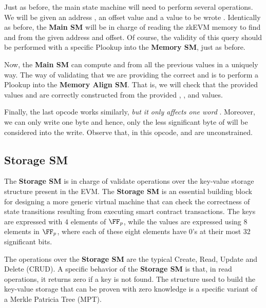 Just as before, the main state machine will need to perform several operations. We will be given an address \addr, an offset value \offset and a value to be wrote \val. Identically as before, the \textbf{Main SM} will be in charge of reading the zkEVM memory to find \mF and \mS from the given address and offset. Of course, the validity of this query should be performed with a specific Plookup into the \textbf{Memory SM}, just as before. 

Now, the \textbf{Main SM} can compute \wF and \wS from all the previous values in a uniquely way. The way of validating that we are providing the correct \wF and \wS is to perform a Plookup into the \textbf{Memory Align SM}. That is, we will check that the provided values \wF and \wS are correctly constructed from the provided \val, \mF, \mS and \offset values. 


Finally, the last opcode \MSTOREE works similarly, \textit{but it only affects one word} \mF. Moreover, we can only write one byte and hence, only the less significant byte of \val will be considered into the write. Observe that, in this opcode, \mS and \wS are unconstrained.




\subsection{Storage SM}


The \textbf{Storage SM} is  in charge of validate operations over the key-value storage structure present in the EVM. The \textbf{Storage SM} is an essential building block for designing a more generic virtual machine that can check the correctness of state transitions resulting from executing smart contract transactions. The keys are expressed with 4 elements of $\FF_p$, while the values are expressed using 8 elements in $\FF_p$, where each of these eight elements have 0's at their most 32 significant bits.


The operations over the \textbf{Storage SM} are the typical Create, Read, Update and Delete (CRUD). A specific behavior of the \textbf{Storage SM} is that, in read operations, it returns zero if a key is not found. The structure used to build the key-value storage that can be proven with zero knowledge is a specific variant 
of a Merkle Patricia Tree (MPT).

